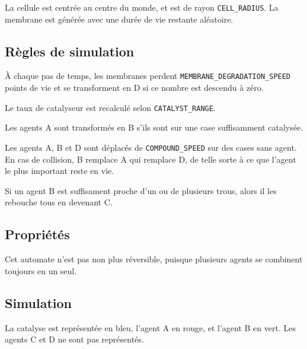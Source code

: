 \documentclass[11pt]{scrartcl}
\begin{document}
            La cellule est centrée au centre du monde, et est de rayon \texttt{CELL\_RADIUS}.
            La membrane est générée avec une durée de vie restante aléatoire.
        
        \subsection{Règles de simulation}
            À chaque pas de temps, les membranes perdent \texttt{MEMBRANE\_DEGRADATION\_SPEED} points de vie et se transforment en D si ce nombre
            est descendu à zéro.
            
            Le taux de catalyseur est recalculé selon \texttt{CATALYST\_RANGE}.
            
            Les agents A sont transformés en B s'ils sont sur une case suffisamment catalysée.
            
            Les agents A, B et D sont déplacés de \texttt{COMPOUND\_SPEED} sur des cases sans agent.
            En cas de collision, B remplace A qui remplace D, de telle sorte à ce que l'agent le plus important reste en vie.
            
            Si un agent B est suffisament proche d'un ou de plusieurs trous, alors il les rebouche tous en devenant C.
        
        \subsection{Propriétés}
            Cet automate n'est pas non plus réversible, puisque plusieurs agents se combinent toujours en un seul.
        
        \subsection{Simulation}
            La catalyse est représentée en bleu, l'agent A en rouge, et l'agent B en vert.
            Les agents C et D ne sont pas représentés.
    
\end{document}
